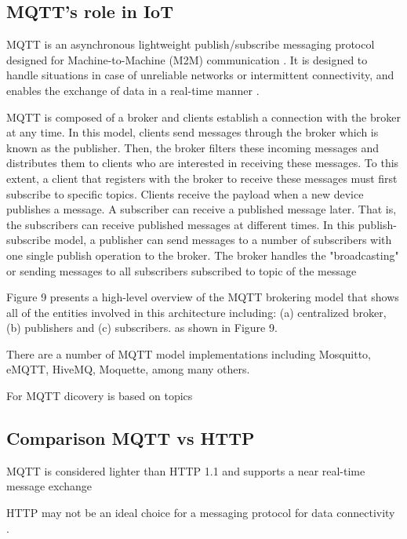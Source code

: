 \subsection{MQTT's role in IoT}
MQTT is an asynchronous lightweight publish/subscribe messaging protocol designed for Machine-to-Machine (M2M) communication \cite[2]{protocols}. It is designed to handle situations in case of unreliable networks or intermittent connectivity, and enables the exchange of data in a real-time manner \cite[10]{protocols}. 

MQTT is composed of a broker and clients establish a connection with the
broker at any time. In this model, clients send messages through the broker which is known as the publisher. Then, the broker filters these incoming messages and distributes them to clients who are interested in receiving these messages. To this extent, a client that registers with the broker to receive these messages must first subscribe to specific topics. Clients receive the payload when a new device publishes a message. A subscriber can receive a published message later. That is, the subscribers can receive published messages at different times. In this publish-subscribe model, a publisher can send messages to a number of subscribers with one single publish
operation to the broker. The broker handles the "broadcasting" or sending messages to all subscribers subscribed to topic of the message 

Figure 9
presents a high-level overview of the MQTT brokering
model that shows all of the entities involved in this
architecture including: (a) centralized broker, (b) publishers
and (c) subscribers.  \cite[10]{protocols}
as shown in Figure 9.


There are a number of MQTT model implementations
including Mosquitto, eMQTT, HiveMQ, Moquette, among
many others. \cite[10]{protocols}



For MQTT dicovery is based on topics \cite[27]{protocols}

\subsection{Comparison MQTT vs HTTP}

MQTT is considered lighter than HTTP 1.1 and supports
a near real-time message exchange  \cite[10]{protocols}

HTTP may not be an ideal choice for a messaging protocol for data connectivity \cite[15]{protocols}. 



